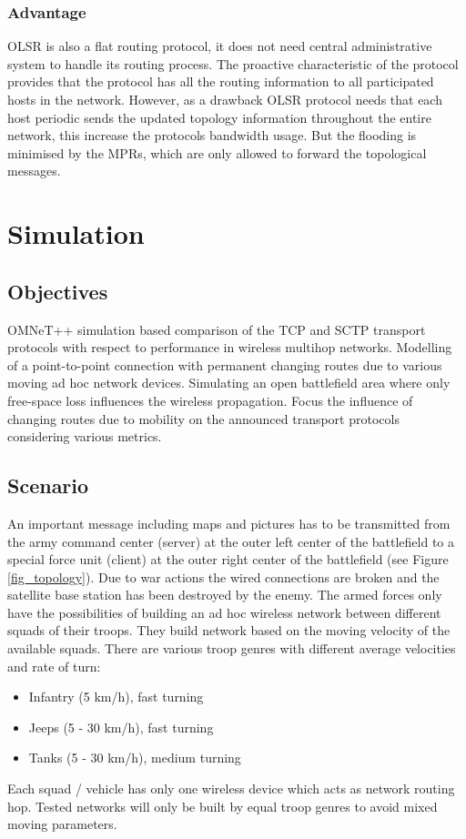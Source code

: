 \documentclass[a4paper]{article}
\begin{document}
\subsubsection{Advantage}
OLSR is also a flat routing protocol, it does not need central administrative system to handle its routing process. The proactive characteristic of the protocol provides that the protocol has all the routing information to all participated hosts in the network. However, as a drawback OLSR
protocol needs that each host periodic sends the updated topology information throughout the entire network, this increase the protocols bandwidth usage. But the flooding is minimised by the MPRs, which are only allowed to forward the topological messages.

\section{Simulation}

\subsection{Objectives}
OMNeT++ simulation based comparison of the TCP and SCTP transport protocols with respect to performance in wireless multihop networks. Modelling of a point-to-point connection with permanent changing routes due to various moving ad hoc network devices. Simulating an open battlefield area where only free-space loss influences the wireless propagation. Focus the influence of changing routes due to mobility on the announced transport protocols considering various metrics.

\subsection{Scenario}
An important message including maps and pictures has to be transmitted from the army command center (server) at the outer left center of the battlefield to a special force unit (client) at the outer right center of the battlefield (see Figure \ref{fig_topology}). Due to war actions the wired connections are broken and the satellite base station has been destroyed by the enemy. The armed forces only have the possibilities of building an ad hoc wireless network between different squads of their troops. They build network based on the moving velocity of the available squads. There are various troop genres with different average velocities and rate of turn:
\begin{itemize}
	\item Infantry (5 km/h), fast turning
	\item Jeeps (5 - 30 km/h), fast turning
	\item Tanks (5 - 30 km/h), medium turning
\end{itemize}		
Each squad / vehicle has only one wireless device which acts as network routing hop. Tested networks will only be built by equal troop genres to avoid mixed moving parameters.
\end{document}
